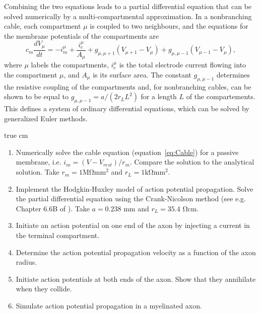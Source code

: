\documentclass[12pt]{article}
\begin{document}
Combining the two equations leads to a partial differential equation
that can be solved numerically by a multi-compartmental approximation.
In a nonbranching cable, each compartment $\mu$ is coupled to two neighbours,
and the equations for the membrane potentials of the compartments are
\begin{equation}
   c_m\frac{dV_\mu}{dt}=-i^\mu_m +
    \frac{i^\mu_e}{A_\mu}+g_{\mu,\mu+1}(V_{\mu+1} -V_\mu)+g_{\mu,\mu-1}(V_{
    \mu-1}-V_{\mu}),
\end{equation}
where $\mu$ labels the compartments, $i^\mu_e$ is the total electrode
current flowing into the compartment $\mu$, and $A_\mu$ is its surface
area. The constant $g_{\mu,\mu-1}$ determines the resistive coupling
of the compartments and, for nonbranching cables, can be shown to be
equal to $g_{\mu,\mu-1}=a/(2r_LL^2)$ for a length $L$ of the compartements.
This defines a system of ordinary differential equations, which can be solved 
by generalized Euler methods.


\newpage


 true cm

\begin{enumerate}
    \item Numerically solve the cable equation (equation~\ref{eq:Cable}) for a
        passive membrane, i.e. $i_m=(V-V_{rest})/r_m$. Compare the
        solution to the analytical solution. Take
        $r_m=1\mathrm{M\Omega mm^2}$ and
        $r_L=1\mathrm{k\Omega mm^2}$.
    \item Implement the Hodgkin-Huxley model of action potential
        propagation. Solve the partial differential equation using the
        Crank-Nicolson method (see e.g. Chapter 6.6B of \cite{dayan2001}).
        Take $a=0.238$ mm and $r_L=35.4$ $\mathrm{\Omega cm}$.
    \item Initiate an action potential on one end of the axon by
        injecting a current in the terminal compartment.
    \item Determine the action potential propagation velocity as a
        function of the axon radius.
    \item Initiate action potentials at both ends of the axon. Show
        that they annihilate when they collide.
    \item Simulate action potential propagation in a myelinated axon.
\end{enumerate}
\end{document}

